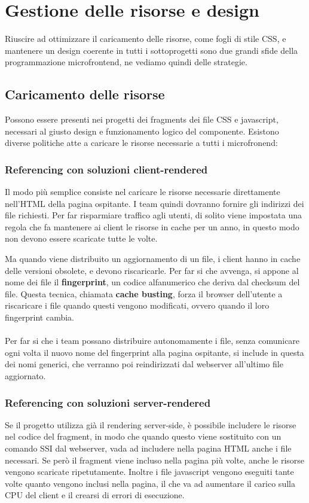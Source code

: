 \chapter{Gestione delle risorse e design}\label{ch:gestionerisorse}

Riuscire ad ottimizzare il caricamento delle risorse, come fogli di stile CSS, 
e mantenere un design coerente in tutti i sottoprogetti sono due
 grandi sfide della programmazione microfrontend, ne vediamo quindi delle strategie.


\section{Caricamento delle risorse}
Possono essere presenti nei progetti dei fragments dei file CSS e javascript, necessari
al giusto design e funzionamento logico del componente. Esistono diverse politiche 
atte a caricare le risorse necessarie a tutti i microfronend:

\subsection{Referencing con soluzioni client-rendered}
Il modo più semplice consiste nel caricare le risorse necessarie direttamente nell'HTML della pagina ospitante.
I team quindi dovranno fornire gli indirizzi dei file richiesti.
Per far risparmiare traffico agli utenti, di solito viene impostata una regola che fa mantenere ai client
le risorse in cache per un anno, in questo modo non devono essere scaricate tutte le volte.

Ma quando viene distribuito un aggiornamento di un file, i client hanno in cache delle versioni obsolete, e devono riscaricarle.
Per far si che avvenga, si appone al nome dei file il \textbf{fingerprint}, un codice alfanumerico che deriva dal checksum del file.
Questa tecnica, chiamata \textbf{cache busting}, forza il browser dell'utente a riscaricare i file quando questi vengono modificati,
ovvero quando il loro fingerprint cambia.
\\\\
Per far si che i team possano distribuire autonomamente i file, senza comunicare ogni volta il nuovo nome del
fingerprint alla pagina ospitante, si include in questa dei nomi generici, che verranno poi reindirizzati dal webserver all'ultimo file aggiornato.



\subsection{Referencing con soluzioni server-rendered}
Se il progetto utilizza già il rendering server-side, è possibile includere le risorse nel codice
del fragment, in modo che quando questo viene sostituito con un comando SSI dal webserver, vada ad includere
nella pagina HTML anche i file necessari. Se però il fragment viene incluso nella pagina più volte, anche le risorse vengono 
scaricate ripetutamente. Inoltre i file javascript vengono eseguiti tante volte quanto vengono inclusi nella pagina,
il che va ad aumentare il carico sulla CPU del client e il crearsi di errori di esecuzione.


